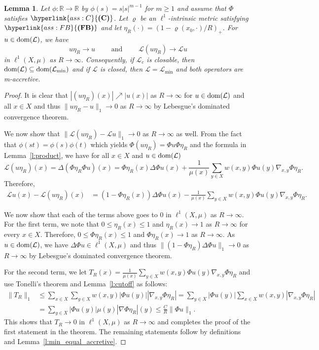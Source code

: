 \documentclass[letterpaper]{article}
\newtheorem{lemma}{Lemma}[section]
\theoremstyle{definition}
\theoremstyle{named}
\numberwithin{equation}{section}
\newcommand{\C}{\hyperlink{ass:C}{\textup{\textbf{(C)}}}}
\newcommand{\FB}{\hyperlink{ass:FB}{\textup{\textbf{(FB)}}}}
\newcommand{\R}{\mathbb{R}}
\newcommand{\dom}{\textnormal{dom}} %
\newcommand{\Deltaphi}{\mathcal{L}}
\newcommand{\deltaphim}{\mathcal{L}_{\min}}
\begin{document}
\begin{lemma}\label{l:main_approx}
Let $\phi\colon \R \to \R$ by $\phi(s) = s |s|^{m-1}$ for $m\geq1$
and assume that $\Phi$ satisfies $\C$.
Let $\varrho$ be an $\ell^1$-intrinsic metric satisfying $\FB$ 
and let $\eta_R(\cdot) = \left(1 - {\varrho(x_0, \cdot)}/{R} \right)_+$. 
For $u \in \dom(\Deltaphi)$, we have
$$ u\eta_R \to u \qquad \text{ and } \qquad \Deltaphi(u\eta_R) \to \Deltaphi u$$
in $\ell^1(X,\mu)$ as $R \to \infty$.
Consequently, if $\Deltaphi_c$ is closable, then $\dom(\Deltaphi) \subseteq \dom(\deltaphim)$ and
if $\Deltaphi$ is closed, then $\Deltaphi=\deltaphim$ and both operators are m-accretive.
\end{lemma}
\begin{proof}
It is clear that $|(u\eta_R)(x)| \nearrow |u(x)|$ as $R \to \infty$ for $u \in \dom(\Deltaphi)$
and all $x \in X$ and thus $ \|u \eta_R - u \|_1 \to 0$ as $R \to \infty$ by Lebesgue's dominated convergence theorem.

We now show that $\|\Deltaphi (u \eta_R) - \Deltaphi u\|_1 \to 0$ as $R \to \infty$ as well.
From the fact that $\phi(st)=\phi(s)\phi(t)$ which yields
$\Phi (u \eta_R) =\Phi u \Phi \eta_R$ and the formula in Lemma~\ref{l:product}, we have
for all $x \in X$ and $u \in \dom(\Deltaphi)$
$$
\Deltaphi(u\eta_R)(x) = \Delta (\Phi \eta_R \Phi u)(x)= \Phi \eta_R(x) \Delta \Phi u(x) +
\frac{1}{\mu(x)} \sum_{y \in X} w(x,y) \Phi u(y)\nabla_{x,y}\Phi \eta_R.$$
Therefore,
\begin{align*}
\Deltaphi u(x)-\Deltaphi(u \eta_R)(x)
&= \left(1 - \Phi \eta_R(x) \right) \Delta \Phi u(x) -
\frac{1}{\mu(x)} \sum_{y \in X} w(x,y) \Phi u(y)\nabla_{x,y}\Phi \eta_R.
\end{align*}

We now show that each of the terms above goes to $0$ in $\ell^1(X,\mu)$ as $R \to \infty$.
For the first term, we note that $0 \leq \eta_R(x) \leq 1$ and 
$\eta_R(x) \to 1$ as $R \to \infty$ for every $x \in X$.
Therefore,
$0 \leq \Phi \eta_R(x) \leq 1$ and
$\Phi \eta_R(x) \to 1$ as $R \to \infty$.
As $u \in \dom(\Deltaphi)$,
we have $\Delta \Phi u \in \ell^1(X,\mu)$ and thus
$\| \left(1 - \Phi \eta_R \right) \Delta \Phi u\|_1 \to 0$ as $R \to \infty$ by
Lebesgue's dominated convergence theorem.

For the second term, we let $T_R(x)= \frac{1}{\mu(x)} \sum_{y \in X} w(x,y) \Phi u(y)\nabla_{x,y}\Phi \eta_R$ 
and use Tonelli's theorem and Lemma~\ref{l:cutoff} as follows:
\begin{align*}
\|T_R\|_1 &\leq \sum_{x \in X} \sum_{y \in X} w(x,y) |\Phi u(y)| |\nabla_{x,y}\Phi \eta_R|   = \sum_{y \in X} |\Phi u(y)| \sum_{x \in X} w(x,y)  |\nabla_{x,y}\Phi \eta_R| \\
&= \sum_{y \in X} |\Phi u(y)| \mu(y) |\nabla \Phi \eta_R |(y) \leq \frac{C}{R} \|\Phi u \|_1.
\end{align*}
This shows that $T_R \to 0$ in $\ell^1(X,\mu)$ as $R \to \infty$ and completes the proof of the
first statement in the theorem. The remaining statements follow by definitions and
Lemma~\ref{l:min_equal_accretive}.
\end{proof}
\end{document}
